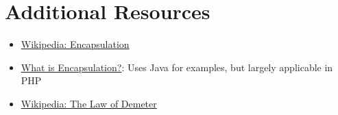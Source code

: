 \section{Additional Resources}

\begin{itemize}[leftmargin=*]
    \item \href{https://en.wikipedia.org/wiki/Encapsulation_(computer_programming)}{Wikipedia: Encapsulation}
    \item \href{https://stackify.com/oop-concept-for-beginners-what-is-encapsulation/}{What is Encapsulation?}: Uses Java for examples, but largely applicable in PHP
    \item \href{https://en.wikipedia.org/wiki/Law\_of\_Demeter}{Wikipedia: The Law of Demeter}
\end{itemize}
